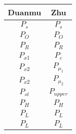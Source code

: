 \begin{tabular}{|c|c|}
	\hline
	Duanmu & Zhu \\
	\hline
$P_s$	&  $P_s$\\
$P_O$	&  $P_O$\\
$P_R$	&  $P_R$\\
$P_{x1}$	&  $P_c$\\
$P_{x2}$	&  $P_{\mu_1}$\\
$P_{x2}$	&  $P_{\mu_2}$\\
$P_{st}$	&  $P_{upper}$\\
$P_{H}$	&  $P_{H}$\\
$P_{L}$	&  $P_{L}$\\
$P_{L}$	&  $P_{L}$\\
	\hline
\end{tabular}





